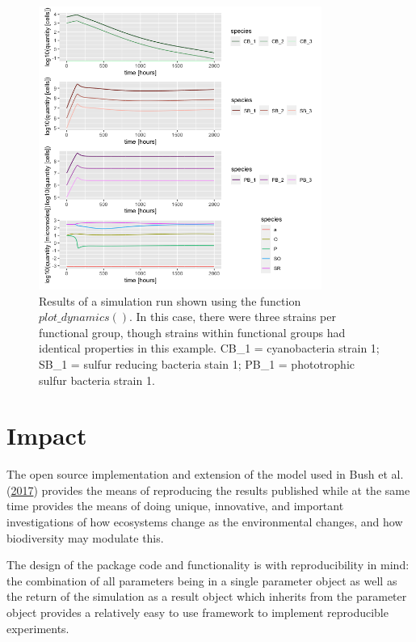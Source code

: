 \documentclass[
]{article}
\begin{document}
\begin{figure}

{\centering \includegraphics[width=350px]{figures/ug_three_strains_dynamics} 

}

\caption{Results of a simulation run shown using the function $plot\_dynamics()$. In this case, there were three strains per functional group, though strains within functional groups had identical properties in this example. CB\_1 = cyanobacteria strain 1; SB\_1 = sulfur reducing bacteria stain 1; PB\_1 = phototrophic sulfur bacteria strain 1.}\label{fig:plot-dynamics}
\end{figure}

\hypertarget{impact}{%
\section{Impact}\label{impact}}

The open source implementation and extension of the model used in Bush
et al. (\protect\hyperlink{ref-Bush2017}{2017}) provides the means of
reproducing the results published while at the same time provides the
means of doing unique, innovative, and important investigations of how
ecosystems change as the environmental changes, and how biodiversity may
modulate this.

The design of the package code and functionality is with reproducibility
in mind: the combination of all parameters being in a single parameter
object as well as the return of the simulation as a result object which
inherits from the parameter object provides a relatively easy to use
framework to implement reproducible experiments.
\end{document}
